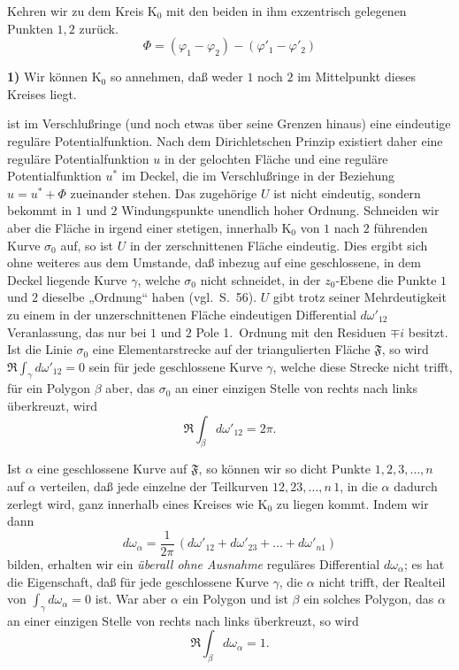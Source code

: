 \documentclass{article}
\begin{document}
Kehren wir zu dem Kreis $\mathrm{K}_0$ mit den beiden in ihm exzentrisch gelegenen Punkten $1, 2$ zurück.
\[ \Phi = (\varphi_1 - \varphi_2) - (\varphi'_1 - \varphi'_2) \]

\textbf{1)} Wir können $\mathrm{K}_0$ so annehmen, daß weder $1$ noch $2$ im Mittelpunkt dieses Kreises liegt.

ist im Verschlußringe (und noch etwas über seine Grenzen hinaus) eine eindeutige reguläre Potentialfunktion. Nach dem Dirichletschen Prinzip existiert daher eine reguläre Potentialfunktion $u$ in der gelochten Fläche und eine reguläre Potentialfunktion $u^*$ im Deckel, die im Verschlußringe in der Beziehung $u = u^* + \Phi$ zueinander stehen. Das zugehörige $U$ ist nicht eindeutig, sondern bekommt in $1$ und $2$ Windungspunkte unendlich hoher Ordnung. Schneiden wir aber die Fläche in irgend einer stetigen, innerhalb $\mathrm{K}_0$ von $1$ nach $2$ führenden Kurve $\sigma_0$ auf, so ist $U$ in der zerschnittenen Fläche eindeutig. Dies ergibt sich ohne weiteres aus dem Umstande, daß inbezug auf eine geschlossene, in dem Deckel liegende Kurve $\gamma$, welche $\sigma_0$ nicht schneidet, in der $z_0$-Ebene die Punkte $1$ und $2$ dieselbe „Ordnung“ haben (vgl.\ S.~56). $U$ gibt trotz seiner Mehrdeutigkeit zu einem in der unzerschnittenen Fläche eindeutigen Differential $d\omega'_{12}$ Veranlassung, das nur bei $1$ und $2$ Pole 1.\ Ordnung mit den Residuen $\mp i$ besitzt. Ist die Linie $\sigma_0$ eine Elementarstrecke auf der triangulierten Fläche $\mathfrak{F}$, so wird $\Re \displaystyle\int_\gamma d\omega'_{12} = 0$ sein für jede geschlossene Kurve $\gamma$, welche diese Strecke nicht trifft, für ein Polygon $\beta$ aber, das $\sigma_0$ an einer einzigen Stelle von rechts nach links überkreuzt, wird
\[ \Re \int_\beta d\omega'_{12} = 2\pi. \]

Ist $\alpha$ eine geschlossene Kurve auf $\mathfrak{F}$, so können wir so dicht Punkte $1, 2, 3, \dots, n$ auf $\alpha$ verteilen, daß jede einzelne der Teilkurven $12, 23, \dots, n\,1$, in die $\alpha$ dadurch zerlegt wird, ganz innerhalb eines Kreises wie $\mathrm{K}_0$ zu liegen kommt. Indem wir dann
\[ d\omega_\alpha = \frac{1}{2\pi}\,(d\omega'_{12} + d\omega'_{23} + \dots + d\omega'_{n1}) \]
bilden, erhalten wir ein \emph{überall ohne Ausnahme} reguläres Differential $d\omega_\alpha$; es hat die Eigenschaft, daß für jede geschlossene Kurve $\gamma$, die $\alpha$ nicht trifft, der Realteil von $\displaystyle\int_\gamma d\omega_\alpha = 0$ ist. War aber $\alpha$ ein Polygon und ist $\beta$ ein solches Polygon, das $\alpha$ an einer einzigen Stelle von rechts nach links überkreuzt, so wird
\[ \Re \int_\beta d\omega_\alpha = 1. \]
\end{document}
